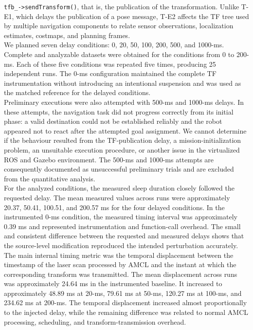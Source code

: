\noindent \texttt{tfb\_->sendTransform()}, that is, the publication of the transformation. Unlike T-E1, which delays the publication of a pose message, T-E2 affects the TF tree used by multiple navigation components to relate sensor observations, localization estimates, costmaps, and planning frames.
\\
We planned seven delay conditions: 0, 20, 50, 100, 200, 500, and 1000-ms. Complete and analyzable datasets were obtained for the conditions from 0 to 200-ms. Each of these five conditions was repeated five times, producing 25 independent runs. The 0-ms configuration maintained the complete TF instrumentation without introducing an intentional suspension and was used as the matched reference for the delayed conditions.
\\
Preliminary executions were also attempted with 500-ms and 1000-ms delays. In these attempts, the navigation task did not progress correctly from its initial phase: a valid destination could not be established reliably and the robot appeared not to react after the attempted goal assignment. We cannot determine if the behaviour resulted from the TF-publication delay, a mission-initialization problem, an unsuitable execution procedure, or another issue in the virtualized ROS and Gazebo environment. The 500-ms and 1000-ms attempts are consequently documented as unsuccessful preliminary trials and are excluded from the quantitative analysis.
\\
For the analyzed conditions, the measured sleep duration closely followed the requested delay. The mean measured values across runs were approximately 20.37, 50.41, 100.51, and 200.57 ms for the four delayed conditions. In the instrumented 0-ms condition, the measured timing interval was approximately 0.39 ms and represented instrumentation and function-call overhead. The small and consistent difference between the requested and measured delays shows that the source-level modification reproduced the intended perturbation accurately.
\\
The main internal timing metric was the temporal displacement between the timestamp of the laser scan processed by AMCL and the instant at which the corresponding transform was transmitted. The mean displacement across runs was approximately 24.64 ms in the instrumented baseline. It increased to approximately 48.89 ms at 20-ms, 79.61 ms at 50-ms, 120.27 ms at 100-ms, and 234.62 ms at 200-ms. The temporal displacement increased almost proportionally to the injected delay, while the remaining difference was related to normal AMCL processing, scheduling, and transform-transmission overhead.
